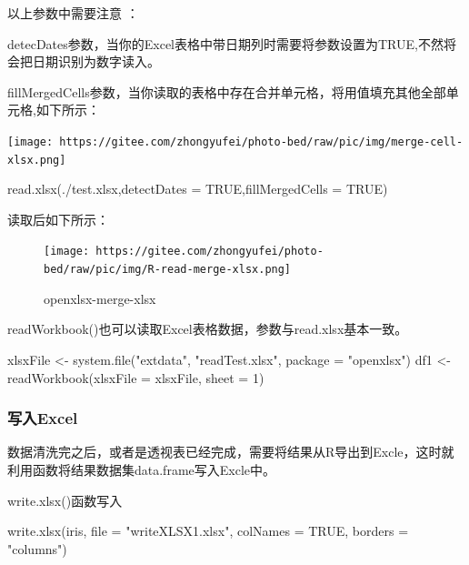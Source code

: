 \documentclass[
]{book}
\newenvironment{Shaded}{\begin{snugshade}}{\end{snugshade}}
\newcommand{\AttributeTok}[1]{\textcolor[rgb]{0.77,0.63,0.00}{#1}}
\newcommand{\ConstantTok}[1]{\textcolor[rgb]{0.00,0.00,0.00}{#1}}
\newcommand{\DecValTok}[1]{\textcolor[rgb]{0.00,0.00,0.81}{#1}}
\newcommand{\FunctionTok}[1]{\textcolor[rgb]{0.00,0.00,0.00}{#1}}
\newcommand{\NormalTok}[1]{#1}
\newcommand{\OtherTok}[1]{\textcolor[rgb]{0.56,0.35,0.01}{#1}}
\newcommand{\StringTok}[1]{\textcolor[rgb]{0.31,0.60,0.02}{#1}}
\begin{document}
以上参数中需要注意 ：

detecDates参数，当你的Excel表格中带日期列时需要将参数设置为TRUE,不然将会把日期识别为数字读入。

fillMergedCells参数，当你读取的表格中存在合并单元格，将用值填充其他全部单元格,如下所示：

\texttt{[image: https://gitee.com/zhongyufei/photo-bed/raw/pic/img/merge-cell-xlsx.png]}

\begin{Shaded}
\begin{Highlighting}[]
\FunctionTok{read.xlsx}\NormalTok{(}\StringTok{\textquotesingle{}./test.xlsx\textquotesingle{}}\NormalTok{,}\AttributeTok{detectDates =} \ConstantTok{TRUE}\NormalTok{,}\AttributeTok{fillMergedCells =} \ConstantTok{TRUE}\NormalTok{)}
\end{Highlighting}
\end{Shaded}

读取后如下所示：

\begin{figure}
\centering
\texttt{[image: https://gitee.com/zhongyufei/photo-bed/raw/pic/img/R-read-merge-xlsx.png]}
\caption{openxlsx-merge-xlsx}
\end{figure}

readWorkbook()也可以读取Excel表格数据，参数与read.xlsx基本一致。

\begin{Shaded}
\begin{Highlighting}[]
\NormalTok{xlsxFile }\OtherTok{\textless{}{-}} \FunctionTok{system.file}\NormalTok{(}\StringTok{"extdata"}\NormalTok{, }\StringTok{"readTest.xlsx"}\NormalTok{, }\AttributeTok{package =} \StringTok{"openxlsx"}\NormalTok{)}
\NormalTok{df1 }\OtherTok{\textless{}{-}} \FunctionTok{readWorkbook}\NormalTok{(}\AttributeTok{xlsxFile =}\NormalTok{ xlsxFile, }\AttributeTok{sheet =} \DecValTok{1}\NormalTok{)}
\end{Highlighting}
\end{Shaded}

\hypertarget{openxlsx:write-function}{%
\subsubsection{写入Excel}\label{openxlsx:write-function}}

数据清洗完之后，或者是透视表已经完成，需要将结果从R导出到Excle，这时就利用函数将结果数据集data.frame写入Excle中。

write.xlsx()函数写入

\begin{Shaded}
\begin{Highlighting}[]
\FunctionTok{write.xlsx}\NormalTok{(iris, }\AttributeTok{file =} \StringTok{"writeXLSX1.xlsx"}\NormalTok{, }\AttributeTok{colNames =} \ConstantTok{TRUE}\NormalTok{, }\AttributeTok{borders =} \StringTok{"columns"}\NormalTok{)}
\end{Highlighting}
\end{Shaded}
\end{document}
